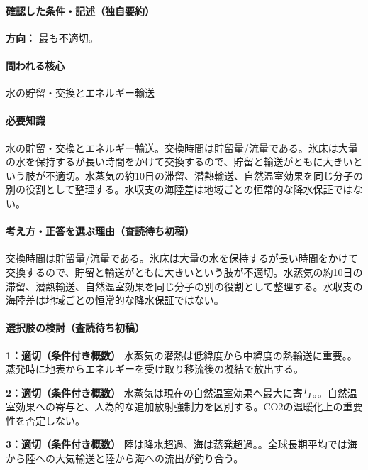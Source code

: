 \paragraph{確認した条件・記述（独自要約）}\mbox{}\par

\noindent\textbf{方向：} 最も不適切。\par

\paragraph{問われる核心} 水の貯留・交換とエネルギー輸送

\paragraph{必要知識} 水の貯留・交換とエネルギー輸送。交換時間は貯留量/流量である。氷床は大量の水を保持するが長い時間をかけて交換するので、貯留と輸送がともに大きいという肢が不適切。水蒸気の約10日の滞留、潜熱輸送、自然温室効果を同じ分子の別の役割として整理する。水収支の海陸差は地域ごとの恒常的な降水保証ではない。

\paragraph{考え方・正答を選ぶ理由（査読待ち初稿）} 交換時間は貯留量/流量である。氷床は大量の水を保持するが長い時間をかけて交換するので、貯留と輸送がともに大きいという肢が不適切。水蒸気の約10日の滞留、潜熱輸送、自然温室効果を同じ分子の別の役割として整理する。水収支の海陸差は地域ごとの恒常的な降水保証ではない。

\paragraph{選択肢の検討（査読待ち初稿）}\mbox{}\par

\noindent\textbf{1：適切（条件付き概数）} 水蒸気の潜熱は低緯度から中緯度の熱輸送に重要。。蒸発時に地表からエネルギーを受け取り移流後の凝結で放出する。\par

\noindent\textbf{2：適切（条件付き概数）} 水蒸気は現在の自然温室効果へ最大に寄与。。自然温室効果への寄与と、人為的な追加放射強制力を区別する。CO2の温暖化上の重要性を否定しない。\par

\noindent\textbf{3：適切（条件付き概数）} 陸は降水超過、海は蒸発超過。。全球長期平均では海から陸への大気輸送と陸から海への流出が釣り合う。\par

